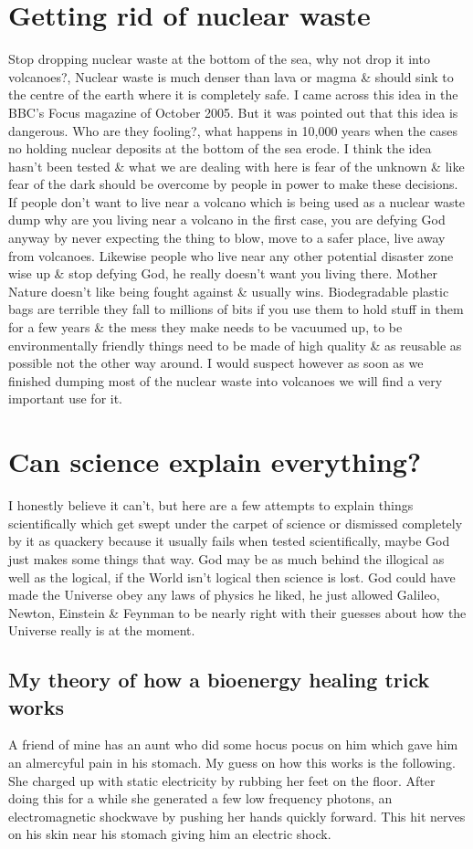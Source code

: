 \documentclass[a4paper,12pt,titlepage]{book}
\begin{document}
\section{Getting rid of nuclear waste}
Stop dropping nuclear waste at the bottom of the sea,
why not drop it into volcanoes?,
Nuclear waste is much denser than lava or magma
\& should sink to the centre of the earth where
it is completely safe.
I came across this idea in the BBC's Focus magazine of October 2005.
But it was pointed out that this idea is dangerous.
Who are they fooling?, what happens in 10,000 years
when the cases no holding nuclear deposits at the bottom
of the sea erode.
I think the idea hasn't been tested \& what
we are dealing with here is fear of the unknown \&
like fear of the dark should be overcome by
people in power to make these decisions.
If people don't want to live near a volcano which
is being used as a nuclear waste dump why are
you living near a volcano in the first case,
you are defying God anyway by never expecting the thing
to blow, move to a safer place, live away from volcanoes.
Likewise people who live near any other potential disaster zone
wise up \& stop defying God, he really doesn't want you living there.
Mother Nature doesn't like being fought against \& usually wins.
Biodegradable plastic bags are terrible they fall to millions of bits
if you use them to hold stuff in them for a few years \& 
the mess they make needs to be vacuumed up,
to be environmentally friendly things need
to be made of high quality \& as reusable as possible not
the other way around. I would suspect however as soon
as we finished dumping most of the nuclear waste into
volcanoes we will find a very important use for it.

\section{Can science explain everything?}
I honestly believe it can't, but here are a few attempts
to explain things scientifically which get swept under 
the carpet of science or dismissed completely by it as quackery
because it usually fails when tested scientifically,
maybe God just makes some things that way.
God may be as much behind the illogical as well
as the logical, if the World isn't logical then
science is lost. God could have made the Universe
obey any laws of physics he liked, he just allowed 
Galileo, Newton, Einstein \& Feynman to be nearly right
with their guesses about how the Universe really is at the moment.

\subsection{My theory of how a bioenergy healing trick works}
A friend of mine has an aunt who did some hocus pocus
on him which gave him an almercyful pain in his stomach.
My guess on how this works is the following.
She charged up with static electricity by rubbing her feet on
the floor. After doing this for a while she generated
a few low frequency photons, an electromagnetic shockwave
by pushing her hands quickly forward.
This hit nerves on his skin near his stomach giving
him an electric shock.
\end{document}
